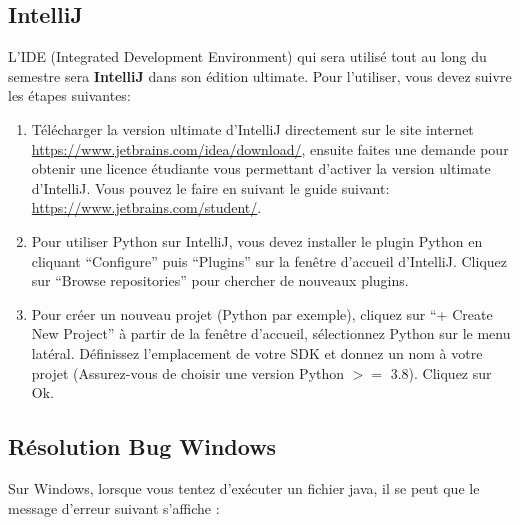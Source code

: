 \subsection*{IntelliJ}

L'IDE (Integrated Development Environment) qui sera utilisé tout au long du semestre sera \textbf{IntelliJ} dans son édition ultimate. Pour l'utiliser, vous devez suivre les étapes suivantes:
\begin{enumerate}
    \item Télécharger la version ultimate d'IntelliJ directement sur le site internet \url{https://www.jetbrains.com/idea/download/}, ensuite faites une demande pour obtenir une licence étudiante vous permettant d'activer la version ultimate d'IntelliJ. Vous pouvez le faire en suivant le guide suivant: \url{https://www.jetbrains.com/student/}.
    \item Pour utiliser Python sur IntelliJ, vous devez installer le plugin Python en cliquant ``Configure'' puis ``Plugins'' sur la fenêtre d'accueil d'IntelliJ. Cliquez sur ``Browse repositories'' pour chercher de nouveaux plugins.
    \item Pour créer un nouveau projet (Python par exemple), cliquez sur ``+ Create New Project'' à partir de la fenêtre d'accueil, sélectionnez Python sur le menu latéral. Définissez l'emplacement de votre SDK et donnez un nom à votre projet (Assurez-vous de choisir une version Python $>=$ 3.8). Cliquez sur Ok.
\end{enumerate}

\subsection*{Résolution Bug Windows}

Sur Windows, lorsque vous tentez d'exécuter un fichier java, il se peut que le message d'erreur suivant s'affiche :\\

